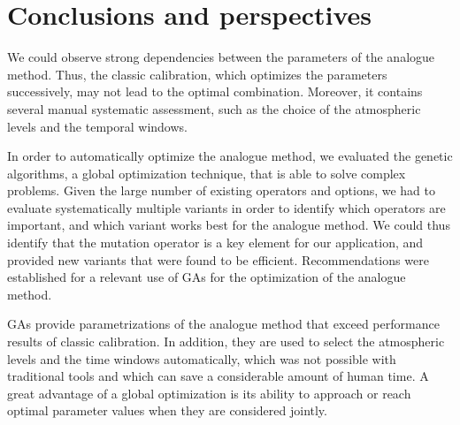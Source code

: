 \documentclass[twocol]{ametsoc}
\begin{document}
	 


	
	


\section{Conclusions and perspectives}

We could observe strong dependencies between the parameters of the analogue method. Thus, the classic calibration, which optimizes the parameters successively, may not lead to the optimal combination. Moreover, it contains several manual systematic assessment, such as the choice of the atmospheric levels and the temporal windows.

In order to automatically optimize the analogue method, we evaluated the genetic algorithms, a global optimization technique, that is able to solve complex problems. Given the large number of existing operators and options, we had to evaluate systematically multiple variants in order to identify which operators are important, and which variant works best for the analogue method. We could thus identify that the mutation operator is a key element for our application, and provided new variants that were found to be efficient. Recommendations were established for a relevant use of GAs for the optimization of the analogue method.

GAs provide parametrizations of the analogue method that exceed performance results of classic calibration. In addition, they are used to select the atmospheric levels and the time windows automatically, which was not possible with traditional tools and which can save a considerable amount of human time. A great advantage of a global optimization is its ability to approach or reach optimal parameter values when they are considered jointly. 
\end{document}
